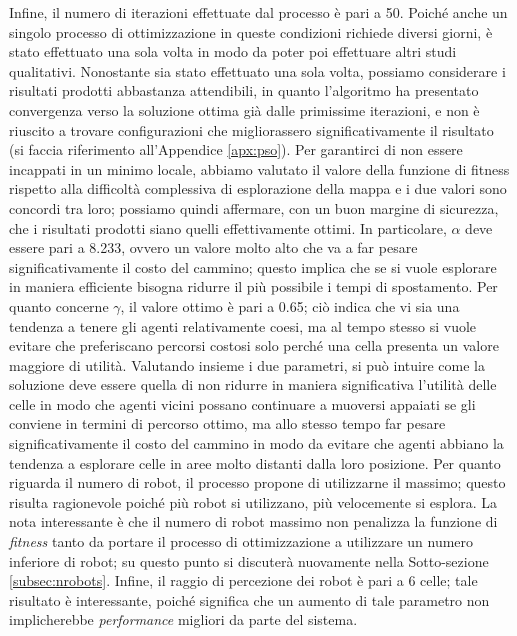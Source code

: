 Infine, il numero di iterazioni effettuate dal processo è pari a 50.
Poiché anche un singolo processo di ottimizzazione in queste condizioni richiede diversi giorni, è stato effettuato una sola volta in modo da poter poi effettuare altri studi qualitativi. 
Nonostante sia stato effettuato una sola volta, possiamo considerare i risultati prodotti abbastanza attendibili, in quanto l'algoritmo ha presentato convergenza verso la soluzione ottima già dalle primissime iterazioni, e non è riuscito a trovare configurazioni che migliorassero significativamente il risultato (si faccia riferimento all'Appendice \ref{apx:pso}).
Per garantirci di non essere incappati in un minimo locale, abbiamo valutato il valore della funzione di fitness rispetto alla difficoltà complessiva di esplorazione della mappa e i due valori sono concordi tra loro; possiamo quindi affermare, con un buon margine di sicurezza, che i risultati prodotti siano quelli effettivamente ottimi.
In particolare, $\alpha$ deve essere pari a 8.233, ovvero un valore molto alto che va a far pesare significativamente il costo del cammino; questo implica che se si vuole esplorare in maniera efficiente bisogna ridurre il più possibile i tempi di spostamento.
Per quanto concerne $\gamma$, il valore ottimo è pari a 0.65; ciò indica che vi sia una tendenza a tenere gli agenti relativamente coesi, ma al tempo stesso si vuole evitare che preferiscano percorsi costosi solo perché una cella presenta un valore maggiore di utilità.
Valutando insieme i due parametri, si può intuire come la soluzione deve essere quella di non ridurre in maniera significativa l'utilità delle celle in modo che agenti vicini possano continuare a muoversi appaiati se gli conviene in termini di percorso ottimo, ma allo stesso tempo far pesare significativamente il costo del cammino in modo da evitare che agenti abbiano la tendenza a esplorare celle in aree molto distanti dalla loro posizione.
Per quanto riguarda il numero di robot, il processo propone di utilizzarne il massimo; questo risulta ragionevole poiché più robot si utilizzano, più velocemente si esplora. La nota interessante è che il numero di robot massimo non penalizza la funzione di \textit{fitness} tanto da portare il processo di ottimizzazione a utilizzare un numero inferiore di robot; su questo punto si discuterà nuovamente nella Sotto-sezione \ref{subsec:nrobots}.
Infine, il raggio di percezione dei robot è pari a 6 celle; tale risultato è interessante, poiché significa che un aumento di tale parametro non implicherebbe \textit{performance} migliori da parte del sistema.
